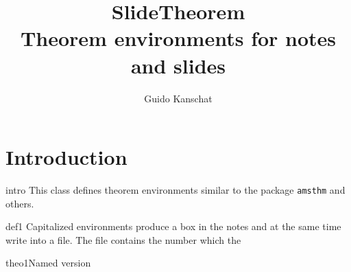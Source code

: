 \documentclass{article}
\title{SlideTheorem\\\large Theorem environments for notes and slides}
\author{Guido Kanschat}
\numberwithin{slidetheorem}{section}
\begin{document}
\maketitle
\section{Introduction}

\begin{Remark}{intro}
  This class defines theorem environments similar to the package \texttt{amsthm} and others.
\end{Remark}

\begin{Definition}{def1}
  Capitalized environments produce a box in the notes and at the same
  time write into a file. The file contains the number which the 
\end{Definition}


\begin{Theorem*}{theo1}{Named version}
  
\end{Theorem*}
\end{document}
